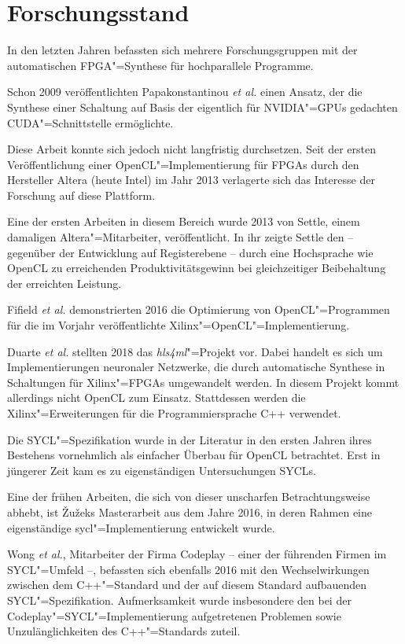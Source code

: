 \section{Forschungsstand}\label{einleitung:forschung}

In den letzten Jahren befassten sich mehrere Forschungsgruppen mit der
automatischen \mbox{FPGA}"=Synthese für hochparallele Programme.

Schon 2009 veröffentlichten Papakonstantinou \textit{et al.} einen Ansatz, der
die Synthese einer Schaltung auf Basis der eigentlich für NVIDIA"=GPUs gedachten
CUDA"=Schnittstelle ermöglichte. \cite[vgl.][]{papakonstantinou2009} 

Diese Arbeit konnte sich jedoch nicht langfristig durchsetzen. Seit der ersten
Veröffentlichung einer OpenCL"=Implementierung für FPGAs durch den Hersteller
Altera (heute Intel) im Jahr 2013 verlagerte sich das Interesse der Forschung
auf diese Plattform. 

Eine der ersten Arbeiten in diesem Bereich wurde 2013 von Settle, einem
damaligen Altera"=Mitarbeiter, veröffentlicht. In ihr zeigte Settle den
-- gegenüber der Entwicklung auf Registerebene -- durch eine Hochsprache wie
OpenCL zu erreichenden Produktivitätsgewinn bei gleichzeitiger Beibehaltung der
erreichten Leistung. \cite[vgl.][]{settle2013}

Fifield \textit{et al.} demonstrierten 2016 die Optimierung von
OpenCL"=Programmen für die im Vorjahr veröffentlichte
Xilinx"=OpenCL"=Implementierung. \cite[vgl.][]{fifield2016}

Duarte \textit{et al.} stellten 2018 das \textit{hls4ml}"=Projekt vor. Dabei
handelt es sich um Implementierungen neuronaler Netzwerke, die durch
automatische Synthese in Schaltungen für Xilinx"=FPGAs umgewandelt werden. In
diesem Projekt kommt allerdings nicht OpenCL zum Einsatz. Stattdessen werden
die Xilinx"=Erweiterungen für die Programmiersprache C++ verwendet.
\cite[vgl.][]{duarte2018}

Die SYCL"=Spezifikation wurde in der Literatur in den ersten Jahren ihres
Bestehens vornehmlich als einfacher Überbau für OpenCL betrachtet. Erst in
jüngerer Zeit kam es zu eigenständigen Untersuchungen SYCLs.

Eine der frühen Arbeiten, die sich von dieser unscharfen Betrachtungsweise
abhebt, ist Žužeks Masterarbeit aus dem Jahre 2016, in deren Rahmen eine
eigenständige \gls{sycl}"=Implementierung entwickelt wurde.
\cite[vgl.][]{zuzek2016}

Wong \textit{et al.}, Mitarbeiter der Firma Codeplay -- einer der führenden
Firmen im SYCL"=Umfeld --, befassten sich ebenfalls 2016 mit den
Wechselwirkungen zwischen dem C++"=Standard und der auf diesem Standard
aufbauenden SYCL"=Spezifikation. Aufmerksamkeit wurde insbesondere den bei der
Codeplay"=SYCL"=Implementierung aufgetretenen Problemen sowie Unzulänglichkeiten
des C++"=Standards zuteil.
\cite[vgl.][]{wong2016}

